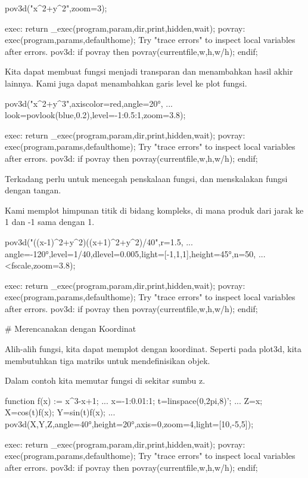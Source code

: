 \documentclass{article}
\begin{document}
\>pov3d("x^2+y^2",zoom=3);


    exec:
        return _exec(program,param,dir,print,hidden,wait);
    povray:
        exec(program,params,defaulthome);
    Try "trace errors" to inspect local variables after errors.
    pov3d:
        if povray then povray(currentfile,w,h,w/h); endif;

Kita dapat membuat fungsi menjadi transparan dan menambahkan hasil
akhir lainnya. Kami juga dapat menambahkan garis level ke plot fungsi.


\>pov3d("x^2+y^3",axiscolor=red,angle=20°, ...  
\>     look=povlook(blue,0.2),level=-1:0.5:1,zoom=3.8);


    exec:
        return _exec(program,param,dir,print,hidden,wait);
    povray:
        exec(program,params,defaulthome);
    Try "trace errors" to inspect local variables after errors.
    pov3d:
        if povray then povray(currentfile,w,h,w/h); endif;

Terkadang perlu untuk mencegah penskalaan fungsi, dan menskalakan
fungsi dengan tangan.


Kami memplot himpunan titik di bidang kompleks, di mana produk dari
jarak ke 1 dan -1 sama dengan 1.


\>pov3d("((x-1)^2+y^2)\*((x+1)^2+y^2)/40",r=1.5, ...  
\>     angle=-120°,level=1/40,dlevel=0.005,light=[-1,1,1],height=45°,n=50, ...  
\>     <fscale,zoom=3.8);


    exec:
        return _exec(program,param,dir,print,hidden,wait);
    povray:
        exec(program,params,defaulthome);
    Try "trace errors" to inspect local variables after errors.
    pov3d:
        if povray then povray(currentfile,w,h,w/h); endif;

# Merencanakan dengan Koordinat

Alih-alih fungsi, kita dapat memplot dengan koordinat. Seperti pada
plot3d, kita membutuhkan tiga matriks untuk mendefinisikan objek.


Dalam contoh kita memutar fungsi di sekitar sumbu z.


\>function f(x) := x^3-x+1; ...  
\>   x=-1:0.01:1; t=linspace(0,2pi,8)'; ...  
\>   Z=x; X=cos(t)\*f(x); Y=sin(t)\*f(x); ...  
\>   pov3d(X,Y,Z,angle=40°,height=20°,axis=0,zoom=4,light=[10,-5,5]);


    exec:
        return _exec(program,param,dir,print,hidden,wait);
    povray:
        exec(program,params,defaulthome);
    Try "trace errors" to inspect local variables after errors.
    pov3d:
        if povray then povray(currentfile,w,h,w/h); endif;
\end{document}
